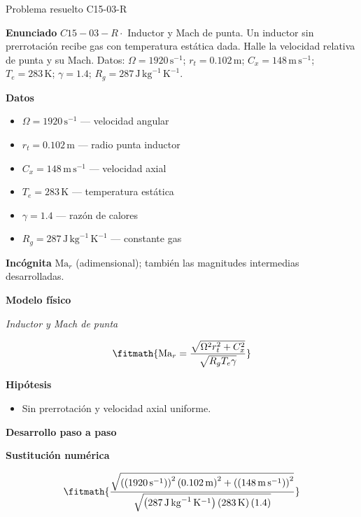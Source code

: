 \documentclass[10pt,openany]{book}
\begin{document}
\begin{studiumworked}{Problema resuelto C15-03-R}


\noindent\textbf{Enunciado}
\(C15-03-R \cdot\) Inductor y Mach de punta. Un inductor sin prerrotación recibe gas con temperatura estática dada. Halle la velocidad relativa de punta y su Mach. Datos: \(\Omega=1920\, \mathrm{s}^{-1}\); \(r_t=0.102\, \mathrm{m}\); \(C_x=148\, \mathrm{m}\,\mathrm{s}^{-1}\); \(T_e=283\, \mathrm{K}\); \(\gamma=1.4\); \(R_g=287\, \mathrm{J}\,\mathrm{kg}^{-1}\,\mathrm{K}^{-1}\).

\noindent\textbf{Datos}
\begin{itemize}
\item $\Omega = 1920\,\mathrm{s}^{-1}$ — velocidad angular
\item $r_t = 0.102\,\mathrm{m}$ — radio punta inductor
\item $C_x = 148\,\mathrm{m}\,\mathrm{s}^{-1}$ — velocidad axial
\item $T_e = 283\,\mathrm{K}$ — temperatura estática
\item $\gamma = 1.4$ — razón de calores
\item $R_g = 287\,\mathrm{J}\,\mathrm{kg}^{-1}\,\mathrm{K}^{-1}$ — constante gas
\end{itemize}

\noindent\textbf{Incógnita}
$\mathrm{Ma}_r$ (adimensional); también las magnitudes intermedias desarrolladas.

\noindent\textbf{Modelo físico}

\noindent\textit{Inductor y Mach de punta}

\[
\fitmath{\mathrm{Ma}_r=\frac{\sqrt{\Omega^{2} r_t^{2} + C_x^{2}}}{\sqrt{R_g T_e \gamma}}}
\]

\noindent\textbf{Hipótesis}
\begin{itemize}
\item Sin prerrotación y velocidad axial uniforme.
\end{itemize}

\noindent\textbf{Desarrollo paso a paso}



\noindent\textbf{Sustitución numérica}

\[
\fitmath{\frac{\sqrt{\left(\left(1920\,\mathrm{s}^{-1}\right)\right)^{2} \left(0.102\,\mathrm{m}\right)^{2} + \left(\left(148\,\mathrm{m}\,\mathrm{s}^{-1}\right)\right)^{2}}}{\sqrt{\left(287\,\mathrm{J}\,\mathrm{kg}^{-1}\,\mathrm{K}^{-1}\right) \left(283\,\mathrm{K}\right) \left(1.4\right)}}}
\]


\end{studiumworked}
\end{document}

